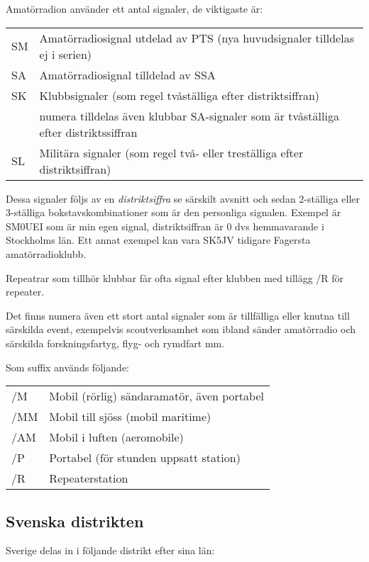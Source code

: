 Amatörradion använder ett antal signaler, de viktigaste är:

\begin{tabular}{ll}
	SM & Amatörradiosignal utdelad av PTS (nya huvudsignaler tilldelas ej i
        serien) \\ SA & Amatörradiosignal tilldelad av SSA \\
    SK & Klubbsignaler
        (som regel tvåställiga efter distriktsiffran) \\
       & numera tilldelas även
         klubbar SA-signaler som är tvåställiga efter distriktssiffran \\
    SL & Militära signaler (som regel två- eller treställiga efter
         distriktsiffran)
\end{tabular}

Dessa signaler följs av en \textit{distriktsiffra} se särskilt avsnitt och sedan
2-ställiga eller 3-ställiga bokstavskombinationer som är den personliga
signalen. Exempel är SM0UEI som är min egen signal, distriktsiffran är 0 dvs
hemmavarande i Stockholms län. Ett annat exempel kan vara SK5JV tidigare
Fagersta amatörradioklubb.

Repeatrar som tillhör klubbar får ofta signal efter klubben med tillägg /R för
repeater.

Det finns numera även ett stort antal signaler som är tillfälliga eller knutna
till särskilda event, exempelvis scoutverksamhet som ibland sänder amatörradio
och särskilda forskningsfartyg, flyg- och rymdfart mm.

Som suffix används följande:

\begin{tabular}{ll}
	/M  & Mobil (rörlig) sändaramatör, även portabel \\
	/MM & Mobil till sjöss (mobil maritime)          \\
	/AM & Mobil i luften (aeromobile)                \\
	/P  & Portabel (för stunden uppsatt station)     \\
	/R  & Repeaterstation
\end{tabular}

\subsection{Svenska distrikten}

Sverige delas in i följande distrikt efter sina län:

